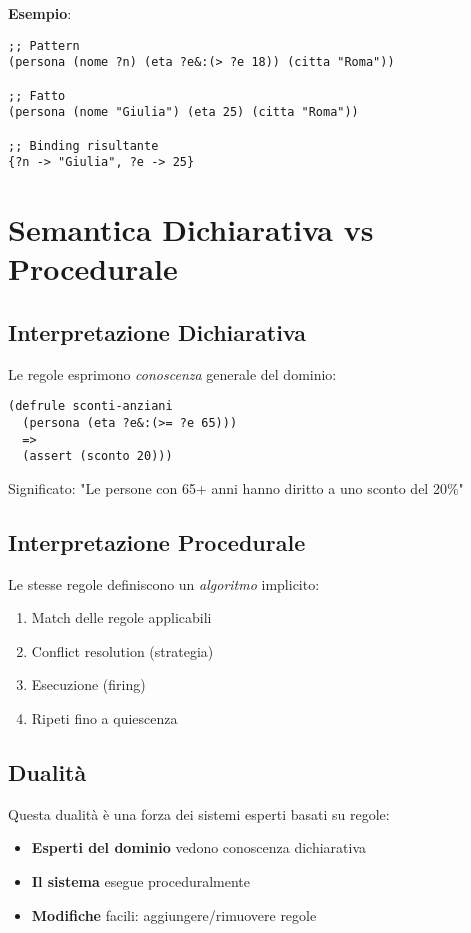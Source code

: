 \textbf{Esempio}:
\begin{lstlisting}[language=CLIPS]
;; Pattern
(persona (nome ?n) (eta ?e&:(> ?e 18)) (citta "Roma"))

;; Fatto
(persona (nome "Giulia") (eta 25) (citta "Roma"))

;; Binding risultante
{?n -> "Giulia", ?e -> 25}
\end{lstlisting}

\section{Semantica Dichiarativa vs Procedurale}

\subsection{Interpretazione Dichiarativa}

Le regole esprimono \textit{conoscenza} generale del dominio:

\begin{lstlisting}[language=CLIPS]
(defrule sconti-anziani
  (persona (eta ?e&:(>= ?e 65)))
  =>
  (assert (sconto 20)))
\end{lstlisting}

Significato: "Le persone con 65+ anni hanno diritto a uno sconto del 20\%"

\subsection{Interpretazione Procedurale}

Le stesse regole definiscono un \textit{algoritmo} implicito:

\begin{enumerate}
\item Match delle regole applicabili
\item Conflict resolution (strategia)
\item Esecuzione (firing)
\item Ripeti fino a quiescenza
\end{enumerate}

\subsection{Dualità}

Questa dualità è una forza dei sistemi esperti basati su regole:
\begin{itemize}
\item \textbf{Esperti del dominio} vedono conoscenza dichiarativa
\item \textbf{Il sistema} esegue proceduralmente
\item \textbf{Modifiche} facili: aggiungere/rimuovere regole
\end{itemize}

